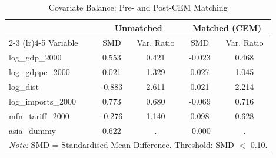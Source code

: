 \begin{table}[htbp]
\centering
\caption{Covariate Balance: Pre- and Post-CEM Matching}
\label{tab:cem_balance}
\small
\begin{tabular}{lcccc}
\hline\hline
& \multicolumn{2}{c}{Unmatched} & \multicolumn{2}{c}{Matched (CEM)} \\
\cmidrule(lr){2-3} \cmidrule(lr){4-5}
Variable & SMD & Var. Ratio & SMD & Var. Ratio \\
\hline
log\_gdp\_2000 & 0.553 & 0.421 & -0.023 & 0.468 \\
log\_gdppc\_2000 & 0.021 & 1.329 & 0.027 & 1.045 \\
log\_dist & -0.883 & 2.611 & 0.021 & 2.214 \\
log\_imports\_2000 & 0.773 & 0.680 & -0.069 & 0.716 \\
mfn\_tariff\_2000 & -0.276 & 1.140 & 0.098 & 0.628 \\
asia\_dummy & 0.622 & . & -0.000 & . \\
\hline\hline
\multicolumn{5}{l}{\footnotesize \textit{Note:} SMD = Standardised Mean Difference. Threshold: SMD $<$ 0.10.} \\
\end{tabular}
\end{table}
